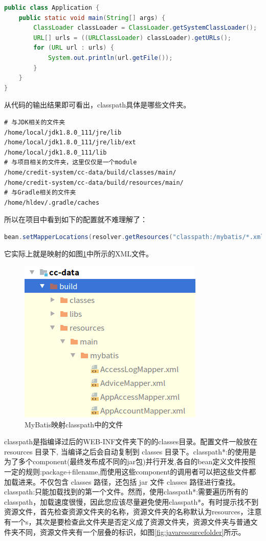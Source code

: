 \documentclass[12pt]{book}
\numberwithin{dummy}{section}
\theoremstyle{ocrenumbox}
\theoremstyle{blacknumex}
\theoremstyle{blacknumbox}
\theoremstyle{ocrenum}
\begin{document}
\begin{lstlisting}[language=Java,basicstyle=\small\ttfamily]
public class Application {
	public static void main(String[] args) {
		ClassLoader classLoader = ClassLoader.getSystemClassLoader();
		URL[] urls = ((URLClassLoader) classLoader).getURLs();
		for (URL url : urls) {
			System.out.println(url.getFile());
		}
	}
}
\end{lstlisting}

从代码的输出结果即可看出，classpath具体是哪些文件夹。

\begin{lstlisting}
# 与JDK相关的文件夹
/home/local/jdk1.8.0_111/jre/lib
/home/local/jdk1.8.0_111/jre/lib/ext
/home/local/jdk1.8.0_111/lib
# 与项目相关的文件夹，这里仅仅是一个module
/home/credit-system/cc-data/build/classes/main/
/home/credit-system/cc-data/build/resources/main/
# 与Gradle相关的文件夹
/home/hldev/.gradle/caches
\end{lstlisting}

所以在项目中看到如下的配置就不难理解了：

\begin{lstlisting}[language=Java]
bean.setMapperLocations(resolver.getResources("classpath:/mybatis/*.xml"));
\end{lstlisting}
它实际上就是映射的如图\ref{fig:classpathfile}中所示的XML文件。

\begin{figure}[tbph]
	\centering
	\includegraphics[scale=0.7]{classpathfile}
	\caption{MyBatis映射classpath中的文件}
	\label{fig:classpathfile}
\end{figure}

classpath是指编译过后的WEB-INF文件夹下的的classes目录。配置文件一般放在 resources 目录下, 当编译之后会自动复制到 classes 目录下。classpath*:的使用是为了多个component(最终发布成不同的jar包)并行开发,各自的bean定义文件按照一定的规则:package+filename,而使用这些component的调用者可以把这些文件都加载进来。不仅包含 classes 路径，还包括 jar 文件 classes 路径进行查找。classpath:只能加载找到的第一个文件。然而，使用classpath*:需要遍历所有的classpath，加载速度很慢，因此您应该尽量避免使用classpath*。有时提示找不到资源文件，首先检查资源文件夹的名称，资源文件夹的名称默认为resources，注意有一个s，其次是要检查此文件夹是否定义成了资源文件夹，资源文件夹与普通文件夹不同，资源文件夹有一个层叠的标识，如图\ref{fig:javaresourcefolder}所示。
\end{document}
